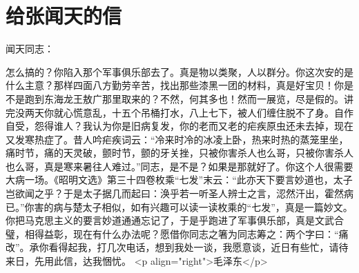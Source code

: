\section[给张闻天的信（一九五九年八月二日）]{给张闻天的信}


闻天同志：

怎么搞的？你陷入那个军事俱乐部去了。真是物以类聚，人以群分。你这次安的是什么主意？那样四面八方勤劳辛苦，找出那些漆黑一团的材料，真是好宝贝！你是不是跑到东海龙王敖广那里取来的？不然，何其多也！然而一展览，尽是假的。讲完没两天你就心慌意乱，十五个吊桶打水，八上七下，被人们缠住脱不了身。自作自受，怨得谁人？我认为你是旧病复发，你的老而又老的疟疾原虫还未去掉，现在又发寒热症了。昔人吟疟疾词云：“冷来时冷的冰凌上卧，热来时热的蒸笼里坐，痛时节，痛的天灵破，颤时节，颤的牙关挫，只被你害杀人也么哥，只被你害杀人也么哥，真是寒来暑往人难过。”同志，是不是？如果是那就好了。你这个人很需要大病一场。《昭明文选》第三十四卷枚乘“七发”末云：“此亦天下要言妙道也，太子岂欲闻之乎？于是太子据几而起曰：涣乎若一听圣人辨士之言，涊然汗出，霍然病已。”你害的病与楚太子相似，如有兴趣可以读一读枚乘的“七发”，真是一篇妙文。你把马克思主义的要言妙道通通忘记了，于是乎跑进了军事俱乐部，真是文武合璧，相得益彰，现在有什么办法呢？愿借你同志之箸为同志筹之：两个字曰：“痛改”。承你看得起我，打几次电话，想到我处一谈，我愿意谈，近日有些忙，请待来日，先用此信，达我悃忧。
<p align="right">毛泽东</p>


